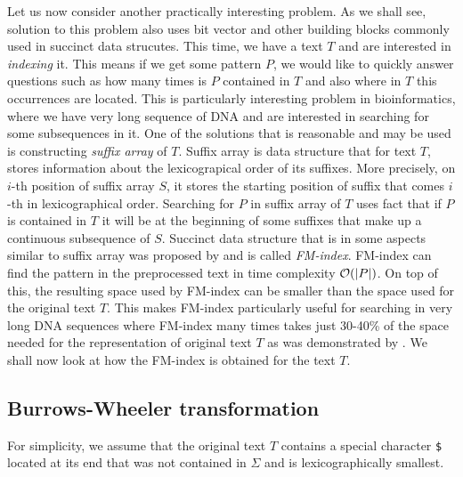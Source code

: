Let us now consider another practically interesting problem. As we shall see, solution
to this problem also uses bit vector and other building blocks commonly used in succinct
data strucutes. This time, we have a text $T$ and are interested in \textit{indexing} it.
This means if we get some pattern $P$, we would like to quickly answer questions such as
how many times is $P$ contained in $T$ and also where in $T$ this occurrences are located.
This is particularly interesting problem in bioinformatics, where we have very long sequence
of DNA and are interested in searching for some subsequences in it. One of the solutions that
is reasonable and may be used is constructing \textit{suffix array} of $T$. Suffix array is
data structure that for text $T$, stores information about the lexicograpical order of its
suffixes. More precisely, on $i$-th position of suffix array $S$, it stores the starting
position of suffix that comes $i$-th in lexicographical order. Searching for $P$ in suffix
array of $T$ uses fact that if $P$ is contained in $T$ it will be at the beginning of some
suffixes that make up a continuous subsequence of $S$. Succinct data structure that is in
some aspects similar to suffix array was proposed by \cite{ferragina2000opportunistic} and
is called \textit{FM-index}. FM-index can find the pattern in the preprocessed text in time
complexity $\mathcal{O}(|P|)$. On top of this, the resulting space used by FM-index can be
smaller than the space used for the original text $T$. This makes FM-index particularly useful
for searching in very long DNA sequences where FM-index many times takes just 30-40\% of the
space needed for the representation of original text $T$ as was demonstrated by
\cite{ferragina2001experimental}. We shall now look at how the FM-index is obtained for the text
$T$.

\subsection{Burrows-Wheeler transformation}

For simplicity, we assume that the original text $T$ contains a special character {\tt \$}
located at its end that was not contained in $\Sigma$ and is lexicographically smallest.

